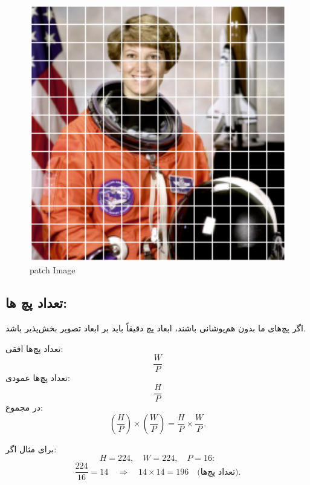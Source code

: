 \begin{figure}[h]
	\centering
	\begin{minipage}[b]{0.9\textwidth}
		\centering
		\includegraphics[width=\textwidth]{transformer_images/space_patch_iamge.png}
		\caption{patch Image}
		\label{fig:Patch Image}
	\end{minipage}
	\hfill
	
\end{figure}

\subsection{تعداد پچ ها:}

اگر پچ‌های ما بدون هم‌پوشانی باشند، ابعاد پچ دقیقاً باید بر ابعاد تصویر بخش‌پذیر باشد.


تعداد پچ‌ها افقی:
\[
\frac{W}{P}
\]
تعداد پچ‌ها عمودی:
\[
\frac{H}{P}
\]
در مجموع:
\[
\left(\frac{H}{P}\right) \times \left(\frac{W}{P}\right) = \frac{H}{P} \times \frac{W}{P}.
\]

برای مثال اگر:
\[
H = 224, \quad W = 224, \quad P = 16:
\]
\[
\frac{224}{16} = 14 \quad \Rightarrow \quad 14 \times 14 = 196 \quad \text{(تعداد پچ‌ها)}.
\]


